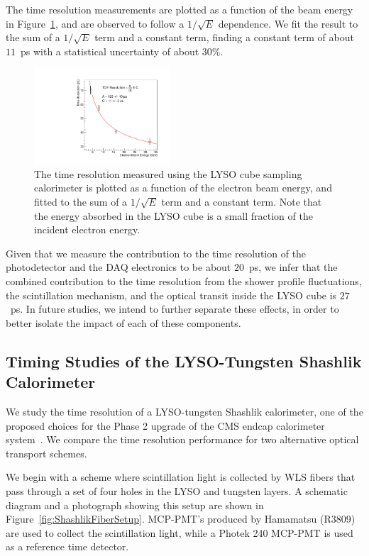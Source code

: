 \documentclass[12pt]{article}
\begin{document}
The time resolution measurements are plotted as a function of the
beam energy in Figure~\ref{fig:LYSOCubeTOFResolutionVsEnergy}, and are observed
to follow a $1/\sqrt{E}$ dependence. We fit the result to the sum of a 
$1/\sqrt{E}$ term and a constant term, finding a constant term of
about $11$~ps with a statistical uncertainty of about $30\%$. 

\begin{figure}[h] \centering
\includegraphics[width=0.45\textwidth]{figs/TimeResolutionVsEnergy_CrystalCube} 
\caption{ The time resolution measured using the LYSO cube
sampling calorimeter is plotted as a function of the electron beam energy, 
and fitted to the sum of a $1/\sqrt{E}$ term and a constant term. Note that the energy absorbed in the LYSO cube is a small fraction of the incident electron energy.}
\label{fig:LYSOCubeTOFResolutionVsEnergy}
\end{figure}

Given that we measure the contribution to the time resolution of the
photodetector and the DAQ electronics to be about $20$~ps, we infer that the
combined contribution to the time resolution from the shower profile
fluctuations, the scintillation mechanism, and the optical transit inside the
LYSO cube is $27$~ps. In future studies, we intend to further separate these
effects, in order to better isolate the impact of each of these components.

\subsection{Timing Studies of the LYSO-Tungsten Shashlik Calorimeter}

We study the time resolution of a LYSO-tungsten Shashlik calorimeter, one of the
proposed choices for the Phase 2 upgrade of the CMS endcap calorimeter
system~\cite{Contardo:1605208}. We compare the time resolution performance for
two alternative optical transport schemes. 

We begin with a scheme where scintillation light is collected by WLS fibers that
pass through a set of four holes in the LYSO and tungsten layers. A schematic
diagram and a photograph showing this setup are shown in
Figure~\ref{fig:ShashlikFiberSetup}. MCP-PMT's produced by Hamamatsu (R3809) are
used to collect the scintillation light, while a Photek 240 MCP-PMT is used as a
reference time detector. 
\end{document}
